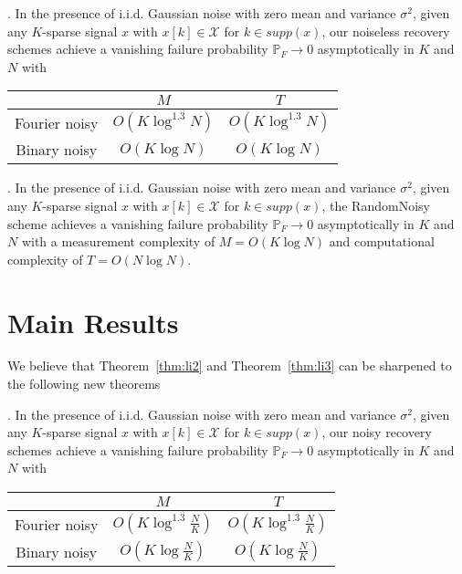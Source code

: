 \documentclass[conference]{IEEEtran}
\begin{document}
\begin{theorem}\label{thm:li2}. In the presence of i.i.d. Gaussian noise with zero mean and
variance $\sigma^2$, given any $K$-sparse signal $x$ with $x[k] \in \mathcal{X}$ for $k \in supp (x)$, our noiseless recovery schemes achieve a vanishing failure probability $\mathbb{P}_F \rightarrow 0$ asymptotically in $K$ and $N$ with
\begin{center}
\begin{tabular}{|c|c|c|}
  \hline
   & $M$ &  $T$ \\
  \hline
  Fourier noisy & $O(K \log^{1.3}N)$ & $O(K \log^{1.3}N)$ \\
  \hline
  Binary noisy & $O(K \log N)$ & $O(K \log N)$ \\
  \hline
\end{tabular}
\end{center}
\end{theorem}
\vspace{2ex}

\begin{theorem}\label{thm:li3}. In the presence of i.i.d. Gaussian noise with zero mean and
variance $\sigma^2$, given any $K$-sparse signal $x$ with $x[k] \in \mathcal{X}$ for $k \in supp (x)$, the RandomNoisy scheme achieves a vanishing failure probability $\mathbb{P}_F \rightarrow 0$ asymptotically in $K$ and $N$ with a measurement complexity of $M = O(K \log N)$ and computational complexity of $T = O(N \log N)$.
\end{theorem}

\section{Main Results}
We believe that Theorem~\ref{thm:li2} and Theorem~\ref{thm:li3} can be sharpened to the following new theorems
\begin{theorem}\label{thm:our1}. In the presence of i.i.d. Gaussian noise with zero mean and
variance $\sigma^2$, given any $K$-sparse signal $x$ with $x[k] \in \mathcal{X}$ for $k \in supp (x)$, our noisy recovery schemes achieve a vanishing failure probability $\mathbb{P}_F \rightarrow 0$ asymptotically in $K$ and $N$ with
\begin{center}
\begin{tabular}{|c|c|c|}
  \hline
   & $M$ &  $T$ \\
  \hline
  Fourier noisy & $O\left(K \log^{1.3} \frac{N}{K} \right)$ & $O\left(K \log^{1.3} \frac{N}{K} \right)$ \\
  \hline
  Binary noisy & $O\left(K \log \frac{N}{K} \right)$  & $O\left(K \log \frac{N}{K} \right)$ \\
  \hline
\end{tabular}
\end{center}
\end{theorem}
\end{document}
